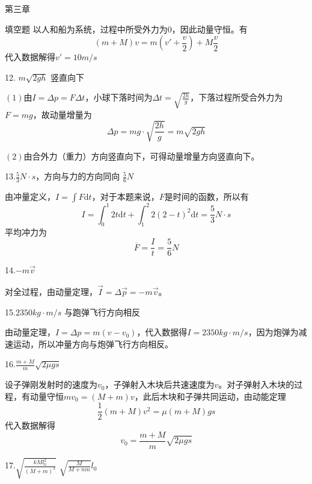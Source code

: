 \documentclass[a4paper,fleqn,twocolumn]{ctexart}
\newcommand{\di}[1]{\mathrm{d}#1}
\begin{document}
\begin{section}{第三章}
\begin{subsection}{填空题}
以人和船为系统，过程中所受外力为$ 0 $，因此动量守恒。有
\begin{equation*}
(m+M)v=m(v'+\frac{v}{2})+M\frac{v}{2} 
\end{equation*}
代入数据解得$ v'=10m/s $

12. $ m\sqrt{2gh} $ \hspace{4em} 竖直向下

$(1)$由$ I=\Delta p=F\Delta t $，小球下落时间为$\Delta t=\sqrt{\frac{2h}{g}}$，下落过程所受合外力为$F=mg$，故动量增量为
\begin{equation*}
\Delta p=mg\cdot\sqrt{\frac{2h}{g}}=m\sqrt{2gh}
\end{equation*}

$(2)$由合外力（重力）方向竖直向下，可得动量增量方向竖直向下。

13.$\frac{5}{3}N\cdot s$，方向与力的方向同向 \hspace{2em} $\frac{5}{6}N$

由冲量定义，$I = \int F \di t$，对于本题来说，$F$是时间的函数，所以有
\begin{equation*}
I = \int_0^1 2t \di t + \int_1^2 2(2-t)^2 \di t = \frac{5}{3}N \cdot s
\end{equation*}
平均冲力为
\begin{equation*}
\overline{F} = \frac{I}{t} = \frac{5}{6} N
\end{equation*}

14.$-m\vec{v}$

对全过程，由动量定理，$\vec{I} = \Delta \vec{p} = -m\vec{v}$。

15.$2350kg\cdot m/s$ \hspace{2em} 与跑弹飞行方向相反

由动量定理，$I = \Delta p = m(v-v_0)$，代入数据得$I=2350kg\cdot m/s$，因为炮弹为减速运动，所以冲量方向与炮弹飞行方向相反。

16.$\frac{m+M}{m}\sqrt{2 \mu gs}$

设子弹刚发射时的速度为$v_0$，子弹射入木块后共速速度为$v$。对子弹射入木块的过程，有动量守恒$mv_0=(M+m)v$，此后木块和子弹共同运动，由动能定理
\begin{equation*}
\frac{1}{2}(m+M)v^2=\mu (m+M)gs
\end{equation*}
代入数据解得
\begin{equation*}
v_0=\frac{m+M}{m}\sqrt{2 \mu gs}
\end{equation*}

17.$\sqrt{\frac{kMl_0^2}{(M+m)^2}}$ \hspace{4em} $\sqrt{\frac{M}{M+nm}}l_0$


\end{subsection}
\end{section}
\end{document}

